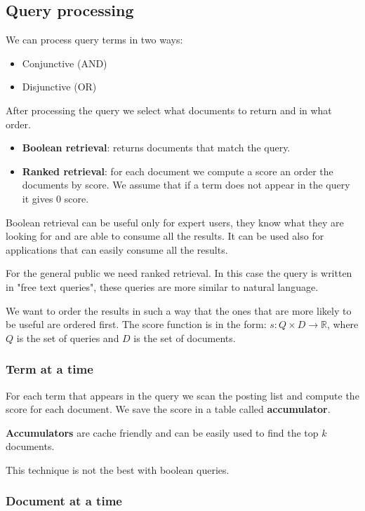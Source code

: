 \subsection{Query processing}
\label{sec:query_processing}

We can process query terms in two ways:
\begin{itemize}
    \item Conjunctive (AND)
    \item Disjunctive (OR)
\end{itemize}

After processing the query we select what documents to return
and in what order.
\begin{itemize}
    \item \textbf{Boolean retrieval}: returns documents that match the query.
    \item \textbf{Ranked retrieval}: for each document we compute a score
    an order the documents by score.
    We assume that if a term does not appear in the query it gives 0 score.
\end{itemize}

Boolean retrieval can be useful only for expert users, they know
what they are looking for and are able to consume all the results.
It can be used also for applications that can easily consume all the results.

For the general public we need ranked retrieval. In this case the query
is written in "free text queries", these queries are more similar to
natural language.

We want to order the results in such a way that the ones that are more
likely to be useful are ordered first.
The score function is in the form: $s: Q\times D \rightarrow \mathbb{R}$,
where $Q$ is the set of queries and $D$ is the set of documents.

\subsubsection{Term at a time}
\label{sec:term_at_a_time}

For each term that appears in the query we scan the posting list and
compute the score for each document. We save the score in a table called
\textbf{accumulator}.

\textbf{Accumulators} are cache friendly and can be easily used to find
the top $k$ documents.

This technique is not the best with boolean queries.

\subsubsection{Document at a time}
\label{sec:document_at_a_time}

